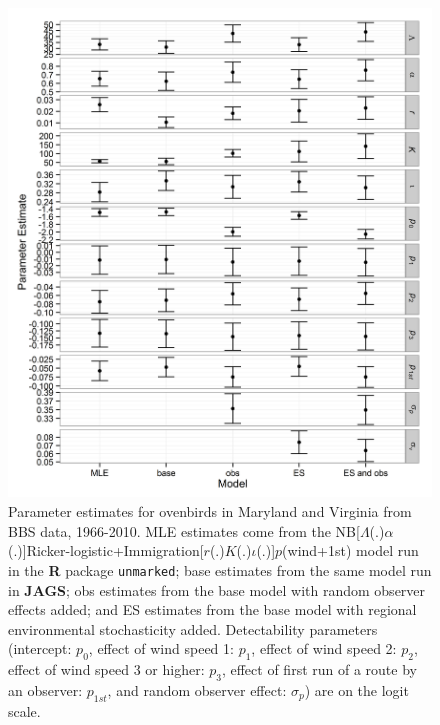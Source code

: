 \documentclass{article}
\begin{document}
\clearpage
\begin{figure}
  \centering
  \includegraphics[width=6.5in]{../figs/oven_par_est}
\caption{Parameter estimates for ovenbirds in Maryland and Virginia from BBS data, 1966-2010.  
MLE estimates come from the NB[$\Lambda$(.)$\alpha$(.)]Ricker-logistic+Immigration[$r$(.)$K$(.)$\iota$(.)]$p$(wind+1st) 
model run in the \textbf{R} package \texttt{unmarked}; base estimates from the same model run in \textbf{JAGS};
obs estimates from the base model with random observer effects added; and ES estimates from the base
model with regional environmental stochasticity added.  Detectability parameters (intercept: $p_{0}$, 
effect of wind speed 1: $p_{1}$, effect of wind speed 2: $p_{2}$, effect of wind speed 3 or higher: $p_{3}$, 
effect of first run of a route by an observer: $p_{1st}$, and random observer effect: $\sigma_{p}$) are on the 
logit scale.}
\label{fig:oven_par_est}
\end{figure}
\end{document}
